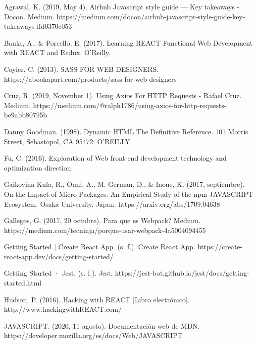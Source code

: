 \renewcommand{\bibname}{}
\patchcmd{\thebibliography}{\chapter*}{\section*}{}{}

\begin{thebibliography}{100} 

 Agrawal, K. (2019, May 4). Airbnb Javascript style guide — Key takeaways - Docon. Medium. https://medium.com/docon/airbnb-javascript-style-guide-key-takeaways-ffd0370c053

 Banks, A., & Porcello, E. (2017). Learning REACT Functional Web Development with REACT and Redux. O’Reilly.

 Coyier, C. (2013). SASS FOR WEB DESIGNERS. https://abookapart.com/products/sass-for-web-designers

Cruz, R. (2019, November 1). Using Axios For HTTP Requests - Rafael Cruz. Medium. https://medium.com/@ralph1786/using-axios-for-http-requests-be9abb80795b

 Danny Goodman. (1998). Dynamic HTML The Definitive Reference. 101 Morris Street, Sebastopol, CA 95472: O'REILLY.

 Fu, C. (2016). Exploration of Web front-end development technology and optimization direction.

\bibitem{} Gaikovina Kula, R., Ouni, A., M. German, D., & Inoue, K. (2017, septiembre). On the Impact of Micro-Packages: An Empirical Study of the npm JAVASCRIPT Ecosystem. Osaka University, Japan. https://arxiv.org/abs/1709.04638

 Gallegos, G. (2017, 20 octubre). Para que es Webpack? Medium. https://medium.com/tecninja/porque-usar-webpack-4a5004094455

 Getting Started | Create React App. (s. f.). Create React App. https://create-react-app.dev/docs/getting-started/

 Getting Started · Jest. (s. f.). Jest. https://jest-bot.github.io/jest/docs/getting-started.html

\bibitem{} Hudson, P. (2016). Hacking with REACT [Libro electrónico]. http://www.hackingwithREACT.com/

 JAVASCRIPT. (2020, 11 agosto). Documentación web de MDN. https://developer.mozilla.org/es/docs/Web/JAVASCRIPT


\end{thebibliography}
